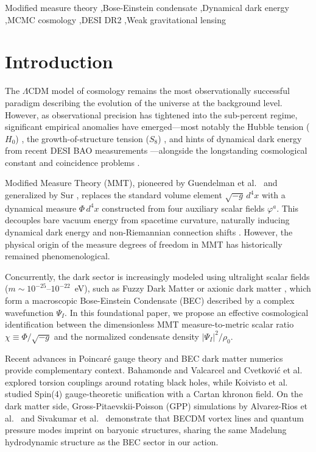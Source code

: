 \documentclass[preprint,12pt]{elsarticle}
\begin{document}
\begin{frontmatter}
\begin{keyword}
Modified measure theory \sep Bose-Einstein condensate \sep Dynamical dark energy \sep MCMC cosmology \sep DESI DR2 \sep Weak gravitational lensing
\end{keyword}

\end{frontmatter}

\section{Introduction}
\label{sec:intro}

The $\Lambda$CDM model of cosmology remains the most observationally successful paradigm describing the evolution of the universe at the background level. However, as observational precision has tightened into the sub-percent regime, significant empirical anomalies have emerged—most notably the Hubble tension ($H_0$) \cite{DiValentino2021}, the growth-of-structure tension ($S_8$) \cite{Moresco2022}, and hints of dynamical dark energy from recent DESI BAO measurements \cite{DESI2024, DESI2025_DR2}—alongside the longstanding cosmological constant and coincidence problems \cite{Weinberg1989}.

Modified Measure Theory (MMT), pioneered by Guendelman et al.~\cite{Guendelman1999} and generalized by Sur \cite{Sur2019, Sur2021}, replaces the standard volume element $\sqrt{-g}\,d^4x$ with a dynamical measure $\Phi\,d^4x$ constructed from four auxiliary scalar fields $\varphi^a$. This decouples bare vacuum energy from spacetime curvature, naturally inducing dynamical dark energy and non-Riemannian connection shifts \cite{Hehl1976}. However, the physical origin of the measure degrees of freedom in MMT has historically remained phenomenological.

Concurrently, the dark sector is increasingly modeled using ultralight scalar fields ($m \sim 10^{-25}\text{--}10^{-22}$~eV), such as Fuzzy Dark Matter \cite{Hu2000} or axionic dark matter \cite{Sikivie2009}, which form a macroscopic Bose-Einstein Condensate (BEC) described by a complex wavefunction $\Psi_I$. In this foundational paper, we propose an effective cosmological identification between the dimensionless MMT measure-to-metric scalar ratio $\chi \equiv \Phi/\sqrt{-g}$ and the normalized condensate density $|\Psi_I|^2/\rho_0$.

Recent advances in Poincar\'e gauge theory and BEC dark matter numerics provide complementary context. Bahamonde and Valcarcel \cite{2603.19140} and Cvetkovi\'c et al.~\cite{2511.15106} explored torsion couplings around rotating black holes, while Koivisto et al.~\cite{Koivisto2026} studied Spin(4) gauge-theoretic unification with a Cartan khronon field. On the dark matter side, Gross-Pitaevskii-Poisson (GPP) simulations by Alvarez-Rios et al.~\cite{2506.17535} and Sivakumar et al.~\cite{2603.18880} demonstrate that BECDM vortex lines and quantum pressure modes imprint on baryonic structures, sharing the same Madelung hydrodynamic structure as the BEC sector in our action.
\end{document}
